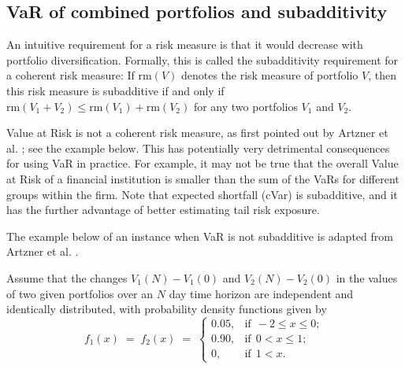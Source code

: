 \subsection{VaR of combined portfolios and subadditivity}

An intuitive requirement for a risk measure is that it would decrease with
portfolio diversification. Formally, this is called the subadditivity
requirement for a coherent risk measure: If $\mathrm{rm}(V)$ denotes the risk
measure of portfolio $V$, then this risk measure is subadditive if and only
if $\mathrm{rm}(V_1 + V_2) \le \mathrm{rm}(V_1) + \mathrm{rm}(V_2)$ for any two
portfolios $V_1$ and $V_2$.

Value at Risk is not a coherent risk measure, as first pointed out by Artzner
et al. \cite{6}; see the example below. This has potentially very detrimental
consequences for using VaR in practice. For example, it may not be true that
the overall Value at Risk of a financial institution is smaller than the sum
of the VaRs for different groups within the firm. Note that expected
shortfall (cVar) is subadditive, and it has the further advantage of better
estimating tail risk exposure.

The example below of an instance when VaR is not subadditive is adapted from
Artzner et al. \cite{6}.

Assume that the changes $V_1(N)-V_1(0)$ and $V_2(N)-V_2(0)$ in the values of
two given portfolios over an $N$ day time horizon are independent and
identically distributed, with probability density functions given by
\begin{equation}
f_1(x) \;=\; f_2(x) \;=\;
\begin{cases}
0.05, & \text{if} \ \ -2 \le x \le 0;\\
0.90, & \text{if} \ \ 0 < x \le 1;\\
0, & \text{if} \ \ 1 < x.
\end{cases}
\end{equation}
